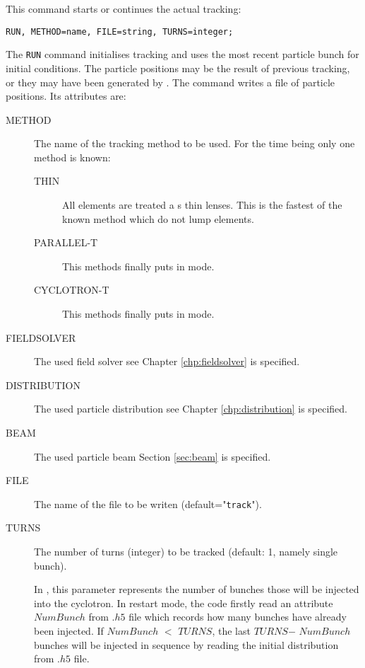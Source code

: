 This command starts or continues the actual tracking:
\begin{verbatim}
RUN, METHOD=name, FILE=string, TURNS=integer;
\end{verbatim}
The \texttt{RUN} command initialises tracking and uses the most recent 
particle bunch for initial conditions.
The particle positions may be the result of previous tracking,
or they may have been generated by 
.
The command writes a file of particle positions.
Its attributes are:
\begin{description}
\item[METHOD]
  The name of the tracking method to be used.
  For the time being only one method is known:
  \begin{description}
  \item[THIN]
    All elements are treated a s thin lenses.
    This is the fastest of the known method which do not lump elements.
    \item[PARALLEL-T]
    This methods finally puts \opal in \opalt mode.
     \item[CYCLOTRON-T]
    This methods finally puts \opal in \opalcycl mode.
     \end{description}  
    \item[FIELDSOLVER]
     The used field solver see Chapter \ref{chp:fieldsolver} is specified.	
    
     \item[DISTRIBUTION]
     The used particle distribution see Chapter \ref{chp:distribution} is specified.	
 
   \item[BEAM]
     The used particle beam Section \ref{sec:beam} is specified.	


\item[FILE]
  The name of the file to be writen (default="\texttt{track}").
\item[TURNS]
  The number of turns (integer) to be tracked (default: 1, namely single bunch).

  In \opalcycl, this parameter represents the number of bunches those will be injected into the cyclotron. In restart mode, the code
  firstly read an attribute $NumBunch$ from $.h5$ file which records how many bunches have already been injected. If $NumBunch$
  $<$ $TURNS$, the last $TURNS$$ -$ $NumBunch$ bunches will be injected in sequence by reading the initial distribution from $.h5$ file.   


\end{description}
